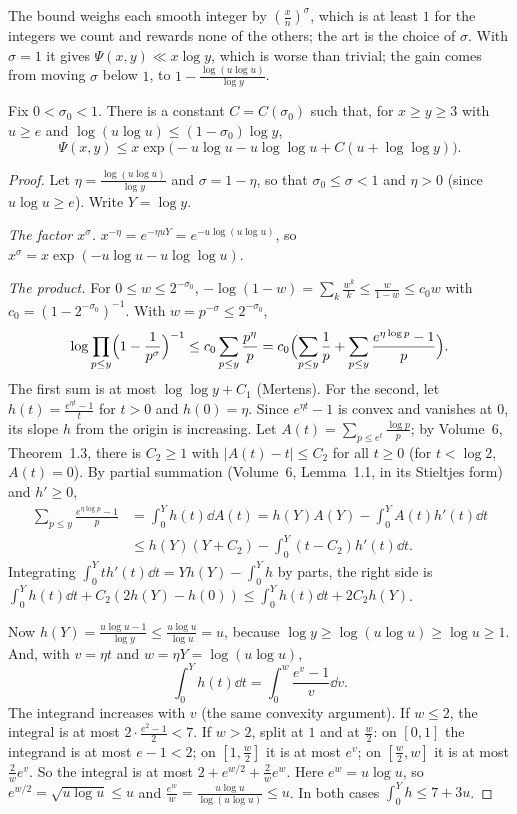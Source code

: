 The bound weighs each smooth integer by $(\frac xn)^\sigma$, which is at least $1$ for the integers we count and rewards none of the others; the art is the choice of $\sigma$. With $\sigma=1$ it gives $\Psi(x,y)\ll x\log y$, which is worse than trivial; the gain comes from moving $\sigma$ below $1$, to $1-\frac{\log(u\log u)}{\log y}$.

\begin{theorem}\label{thm:rankin}
Fix $0<\sigma_0<1$. There is a constant $C=C(\sigma_0)$ such that, for $x\ge y\ge3$ with $u\ge e$ and $\log(u\log u)\le(1-\sigma_0)\log y$,
\[
\Psi(x,y)\le x\exp\bigl(-u\log u-u\log\log u+C(u+\log\log y)\bigr).
\]
\end{theorem}
\begin{proof}
Let $\eta=\frac{\log(u\log u)}{\log y}$ and $\sigma=1-\eta$, so that $\sigma_0\le\sigma<1$ and $\eta>0$ (since $u\log u\ge e$). Write $Y=\log y$.

\emph{The factor $x^\sigma$.} $x^{-\eta}=e^{-\eta uY}=e^{-u\log(u\log u)}$, so $x^\sigma=x\exp(-u\log u-u\log\log u)$.

\emph{The product.} For $0\le w\le2^{-\sigma_0}$, $-\log(1-w)=\sum_k\frac{w^k}k\le\frac w{1-w}\le c_0w$ with $c_0=(1-2^{-\sigma_0})^{-1}$. With $w=p^{-\sigma}\le2^{-\sigma_0}$,
\[
\log\prod_{p\le y}\Bigl(1-\frac1{p^\sigma}\Bigr)^{-1}\le c_0\sum_{p\le y}\frac{p^\eta}p=c_0\Bigl(\sum_{p\le y}\frac1p+\sum_{p\le y}\frac{e^{\eta\log p}-1}p\Bigr).
\]
The first sum is at most $\log\log y+C_1$ (Mertens). For the second, let $h(t)=\frac{e^{\eta t}-1}t$ for $t>0$ and $h(0)=\eta$. Since $e^{\eta t}-1$ is convex and vanishes at $0$, its slope $h$ from the origin is increasing. Let $A(t)=\sum_{p\le e^t}\frac{\log p}p$; by Volume~6, Theorem~1.3, there is $C_2\ge1$ with $|A(t)-t|\le C_2$ for all $t\ge0$ (for $t<\log2$, $A(t)=0$). By partial summation (Volume~6, Lemma~1.1, in its Stieltjes form) and $h'\ge0$,
\[
\begin{aligned}\sum_{p\le y}\frac{e^{\eta\log p}-1}p&=\int_0^Yh(t)\dd A(t)=h(Y)A(Y)-\int_0^YA(t)h'(t)\dd t\\&\le h(Y)(Y+C_2)-\int_0^Y(t-C_2)h'(t)\dd t.\end{aligned}
\]
Integrating $\int_0^Yth'(t)\dd t=Yh(Y)-\int_0^Yh$ by parts, the right side is $\int_0^Yh(t)\dd t+C_2(2h(Y)-h(0))\le\int_0^Yh(t)\dd t+2C_2h(Y)$.

Now $h(Y)=\frac{u\log u-1}{\log y}\le\frac{u\log u}{\log u}=u$, because $\log y\ge\log(u\log u)\ge\log u\ge1$. And, with $v=\eta t$ and $w=\eta Y=\log(u\log u)$,
\[
\int_0^Yh(t)\dd t=\int_0^w\frac{e^v-1}v\dd v.
\]
The integrand increases with $v$ (the same convexity argument). If $w\le2$, the integral is at most $2\cdot\frac{e^2-1}2<7$. If $w>2$, split at $1$ and at $\frac w2$: on $[0,1]$ the integrand is at most $e-1<2$; on $[1,\frac w2]$ it is at most $e^v$; on $[\frac w2,w]$ it is at most $\frac2we^v$. So the integral is at most $2+e^{w/2}+\frac2we^w$. Here $e^w=u\log u$, so $e^{w/2}=\sqrt{u\log u}\le u$ and $\frac{e^w}w=\frac{u\log u}{\log(u\log u)}\le u$. In both cases $\int_0^Yh\le7+3u$.


\end{proof}
